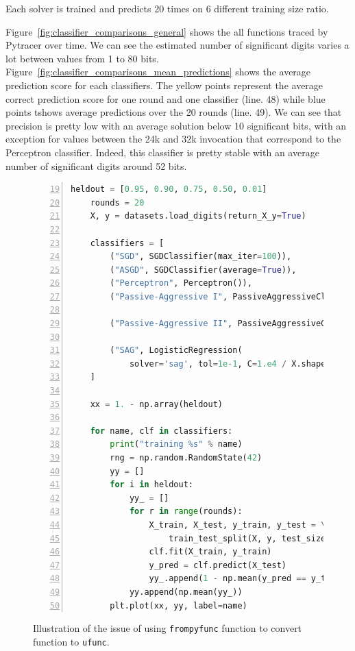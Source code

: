 \documentclass[11pt]{article}
\begin{document}
Each solver is trained and predicts 20 times on 6 different training size ratio.

Figure~\ref{fig:classifier_comparisons_general} shows the all functions
traced by Pytracer over time. We can see the estimated number of significant digits varies a lot between 
values from 1 to 80 bits. Figure~\ref{fig:classifier_comparisons_mean_predictions} shows 
the average prediction score for each classifiers. The yellow points 
represent the average correct prediction score for one round and one classifier (line. 48) while blue points
tshows average predictions over the 20 rounds (line. 49).
We can see that precision is pretty low with an average solution below 10 significant bits, with 
an exception for values between the 24k and 32k invocation that correspond to the Perceptron
classifier. Indeed, this classifier is pretty stable with an average number of significant digits around 52 bits.


\begin{figure}
    \begin{lstlisting}[language=Python,style=customPython,numbers=left, firstnumber=19]
    heldout = [0.95, 0.90, 0.75, 0.50, 0.01]
    rounds = 20
    X, y = datasets.load_digits(return_X_y=True)

    classifiers = [
        ("SGD", SGDClassifier(max_iter=100)),
        ("ASGD", SGDClassifier(average=True)),
        ("Perceptron", Perceptron()),
        ("Passive-Aggressive I", PassiveAggressiveClassifier(loss='hinge',
                                                             C=1.0, tol=1e-4)),
        ("Passive-Aggressive II", PassiveAggressiveClassifier(loss='squared_hinge',
                                                              C=1.0, tol=1e-4)),
        ("SAG", LogisticRegression(
            solver='sag', tol=1e-1, C=1.e4 / X.shape[0]))
    ]

    xx = 1. - np.array(heldout)

    for name, clf in classifiers:
        print("training %s" % name)
        rng = np.random.RandomState(42)
        yy = []
        for i in heldout:
            yy_ = []
            for r in range(rounds):
                X_train, X_test, y_train, y_test = \
                    train_test_split(X, y, test_size=i, random_state=rng)
                clf.fit(X_train, y_train)
                y_pred = clf.predict(X_test)
                yy_.append(1 - np.mean(y_pred == y_test))
            yy.append(np.mean(yy_))
        plt.plot(xx, yy, label=name)
    \end{lstlisting}
    \label{fig:wrapper_code}
\caption{Illustration of the issue of using \texttt{frompyfunc} function to convert function to \texttt{ufunc}.}
\end{figure}
\end{document}
